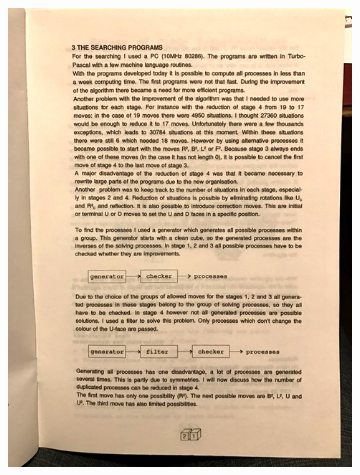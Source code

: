 \documentclass{report}
\begin{document}
\begin{appendices}
\begin{figure}[H]
\begin{subfigure}[b]{0.45\textwidth}
				\includegraphics[width=\textwidth]{Resources/Images/imgKloosterman3.jpg}
			\end{subfigure}
			\hspace{5mm}
			\begin{subfigure}[b]{0.45\textwidth}

\end{subfigure}
\end{figure}
\end{appendices}
\end{document}
